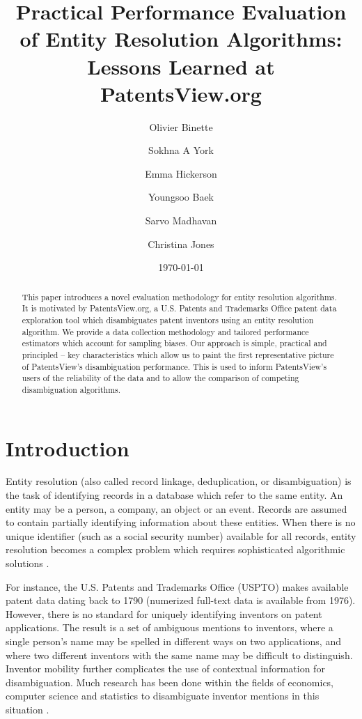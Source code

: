 \documentclass[fontsize=11pt]{article}
\title{Practical Performance Evaluation of Entity Resolution Algorithms: Lessons Learned at PatentsView.org}
\author[1,2]{Olivier Binette}
\author[2]{Sokhna A York}
\author[2]{Emma Hickerson}
\author[1]{Youngsoo Baek}
\author[2]{Sarvo Madhavan}
\author[2]{Christina Jones}
\affil[1]{Duke University}
\affil[2]{American Institutes for Research}
\date{\today}
\newcommand{\ob}[1]{{\color{purple}#1}}
\theoremstyle{definition}
\begin{document}
\maketitle

\begin{abstract}
This paper introduces a novel evaluation methodology for entity resolution algorithms. It is motivated by PatentsView.org, a {U.S. Patents and Trademarks Office patent data exploration tool} which disambiguates patent inventors using an entity resolution algorithm. We provide a data collection methodology and tailored performance estimators which account for sampling biases. Our approach is simple, practical and principled -- key characteristics which allow us to paint the first representative picture of PatentsView's disambiguation performance. This is used to inform PatentsView's users of the reliability of the data and to allow the comparison of competing disambiguation algorithms.
\end{abstract}

\section{Introduction}
Entity resolution (also called record linkage, deduplication, or disambiguation) is the task of identifying records in a database which refer to the same entity. An entity may be a person, a company, an object or an event. Records are assumed to contain partially identifying information about these entities. When there is no unique identifier (such as a social security number) available for all records, entity resolution becomes a complex problem which requires sophisticated algorithmic solutions \citep{Herzog2007, Christen2012, Dong2015, Ilyas2019, Christophides2019, Christen2019, Papadakis2021, Binette2022a}. 

For instance, the U.S. Patents and Trademarks Office (USPTO) makes available patent data dating back to 1790 \ob{(numerized full-text data is available from 1976)}. However, there is no standard for uniquely identifying inventors on patent applications. The result is a set of ambiguous mentions to inventors, where a single person's name may be spelled in different ways on two applications, and where two different inventors with the same name may be difficult to distinguish. \ob{Inventor mobility further complicates the use of contextual information for disambiguation.} Much research has been done within the fields of economics, computer science and statistics to disambiguate inventor mentions \ob{in this situation} \citep{trajtenberg2008identification, ferreira2012brief, ventura2013methods, Li2014, Ventura2015, kim2016random, yang2017mixture, morrison2017disambiguation, muller2017semantic, traylor2017learning, balsmeier2018machine,tam2019optimal, monath2019scalable, doherr2021disambiguation}.
\end{document}
